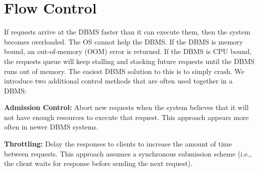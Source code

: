 \documentclass[11pt]{article}
\begin{document}
\section{Flow Control}
If requests arrive at the DBMS faster than it can execute them, then the system becomes 
overloaded. The OS cannot help the DBMS. If the DBMS is memory bound, an out-of-memory (OOM) error 
is returned. If the DBMS is CPU bound, the requests queue will keep stalling and stacking future 
requests until the DBMS runs out of memory. The easiest DBMS solution to this is to simply crash. We 
introduce two additional control methods that are often used together in a DBMS:

\textbf{Admission Control:}
Abort new requests when the system believes that it will not have enough resources to execute that 
request. This approach appears more often in newer DBMS systems.

\textbf{Throttling:}
Delay the responses to clients to increase the amount of time between requests. 
This approach assumes a synchronous submission scheme (i.e., the client waits for response before 
sending the next request).

\newpage


\end{document}
